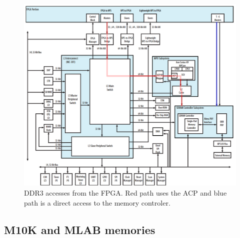 \begin{figure}[H]
    \centering
    \includegraphics[scale=0.4]{Chapter1-Hardware/res/de10_DDR3.PNG}
    \caption{DDR3 accesses from the FPGA. Red path uses the ACP and blue path is a direct access
    to the memory controler.}
    \label{fig:de10/ddr3}
\end{figure}

\subsection{M10K and MLAB memories}

